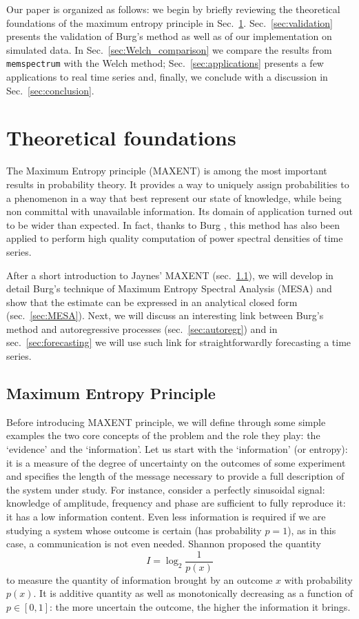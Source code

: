 \documentclass[twocolumn,showpacs,preprintnumbers,nofootinbib,prd,
superscriptaddress,10pt]{revtex4-1}
\begin{document}
Our paper is organized as follows: we begin by briefly reviewing the theoretical foundations of the maximum entropy principle in Sec.~\ref{sec:foundations}. Sec.~\ref{sec:validation} presents the validation of Burg's method as well as of our implementation on simulated data. In Sec.~\ref{sec:Welch_comparison} we compare the results from \texttt{memspectrum} with the Welch method; Sec.~\ref{sec:applications} presents a few applications to real time series and, finally, we conclude with a discussion in Sec.~\ref{sec:conclusion}.


\section{Theoretical foundations}\label{sec:foundations}
The Maximum Entropy principle (MAXENT) is among the most important results in probability theory. It provides a way to uniquely assign probabilities to a phenomenon in a way that best represent our state of knowledge, while being non committal with unavailable information. Its domain of application turned out to be wider than expected. In fact, thanks to Burg \cite{burg1975maximum}, this method has also been applied to perform high quality computation of power spectral densities of time series.

After a short introduction to Jaynes' MAXENT (sec.~\ref{sec:MAXENT}), we will develop in detail Burg's technique of Maximum Entropy Spectral Analysis (MESA) and show that the estimate can be expressed in an analytical closed form (sec.~\ref{sec:MESA}).
Next, we will discuss an interesting link between Burg's method and autoregressive processes (sec.~\ref{sec:autoregr}) and in sec.~\ref{sec:forecasting} we will use such link for straightforwardly forecasting a time series.

\subsection{Maximum Entropy Principle} \label{sec:MAXENT}

Before introducing MAXENT principle, we will define through some simple examples the two core concepts of the problem and the role they play: the `evidence' and the `information'.
Let us start with the `information' (or entropy): it is a measure of the degree of uncertainty on the outcomes of some experiment and specifies the length of the message necessary to provide a full description of the system under study. For instance, consider a perfectly sinusoidal signal: knowledge of amplitude, frequency and phase are sufficient to fully reproduce it: it has a low information content. Even less information is required if we are studying a system whose outcome is certain (has probability $p = 1$), as in this case, a communication is not even needed.  
Shannon \cite{Shannon} proposed the quantity
\begin{equation}\label{eq:information}
    I = \log_2 \frac{1}{p(x)}
\end{equation}
to measure the quantity of information brought by an outcome $x$ with probability $p(x)$. It is additive quantity as well as monotonically decreasing as a function of $p \in [0, 1]$: the more uncertain the outcome, the higher the information it brings.
\end{document}
